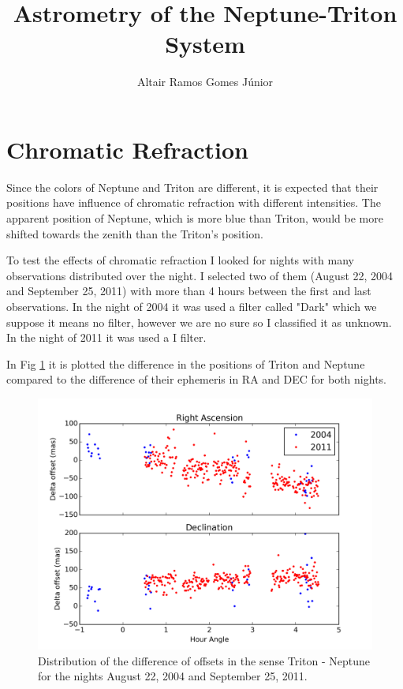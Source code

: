 \documentclass[12pt,a4paper]{report}
\author{Altair Ramos Gomes Júnior}
\title{Astrometry of the Neptune-Triton System}
\begin{document}
\maketitle

\pagestyle{headings}

\section*{Chromatic Refraction}

Since the colors of Neptune and Triton are different, it is expected that their positions have influence of chromatic refraction with different intensities. The apparent position of Neptune, which is more blue than Triton, would be more shifted towards the zenith than the Triton's position.

To test the effects of chromatic refraction I looked for nights with many observations distributed over the night. I selected two of them (August 22, 2004 and September 25, 2011) with more than 4 hours between the first and last observations. In the night of 2004 it was used a filter called "Dark" which we suppose it means no filter, however we are no sure so I classified it as unknown. In the night of 2011 it was used a I filter.

In Fig \ref{Fig:refraction} it is plotted the difference in the positions of Triton and Neptune compared to the difference of their ephemeris in RA and DEC for both nights.

\begin{figure}[h]
\includegraphics[width=16.0cm]{plot_hour_gr1.png} 
\caption{Distribution of the difference of offsets in the sense Triton - Neptune for the nights August 22, 2004 and September 25, 2011.}
\label{Fig:refraction}
\end{figure}
\end{document}
